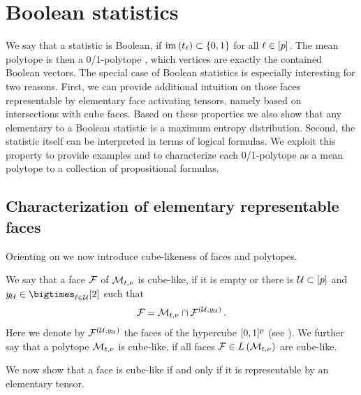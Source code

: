 \section{Boolean statistics}\label{sec:booleanStat}

We say that a statistic is Boolean, if $\mathrm{im}\left(t_{\ell}\right)\subset\{0,1\}$ for all $\ell\in[p]$.
The mean polytope is then a 0/1-polytope \cite{ziegler_lectures_2000}, which vertices are exactly the contained Boolean vectors.
The special case of Boolean statistics is especially interesting for two reasons.
First, we can provide additional intuition on those faces representable by elementary face activating tensors, namely based on intersections with cube faces.
Based on these properties we also show that any elementary \ComputationActivationNetwork{} to a Boolean statistic is a maximum entropy distribution.
Second, the statistic itself can be interpreted in terms of logical formulas.
We exploit this property to provide examples and to characterize each 0/1-polytope as a mean polytope to a collection of propositional formulas.

\subsection{Characterization of elementary representable faces}

Orienting on  we now introduce cube-likeness of faces and polytopes.

\begin{definition}
    \label{def:cubeLike}
    We say that a face $\mathcal{F}$ of $\mathcal{M}_{t,\nu}$ is cube-like, if it is empty or there is $\mathcal{U}\subset[p]$ and $\headindexof{\arbset}\in\bigtimes_{\selindex\in\arbset}[2]$ such that
    \begin{align*}
        \mathcal{F}
        = \mathcal{M}_{t,\nu} \cap \mathcal{F}^{(\mathcal{U},y_{\mathcal{U}})} \, .
    \end{align*}
    Here we denote by $\mathcal{F}^{(\mathcal{U},y_{\mathcal{U}})}$ the faces of the hypercube $[0,1]^{p}$ (see ).
    We further say that a polytope $\mathcal{M}_{t,\nu}$ is cube-like, if all faces $\mathcal{F}\in L\left(\mathcal{M}_{t,\nu}\right)$ are cube-like.
\end{definition}

We now show that a face is cube-like if and only if it is representable by an elementary tensor.

